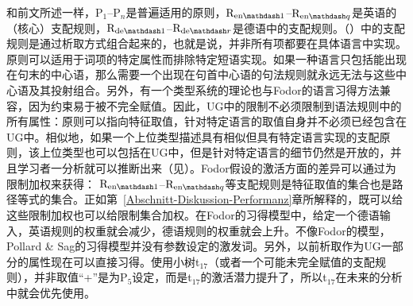 和前文所述一样，P$_1$--P$_n$是普遍适用的原则，$\mathrm{R}_{\mathrm{en}\mathdash1}$--$\mathrm{R}_{\mathrm{en}\mathdash q}$是英语的（核心）支配规则，$\mathrm{R}_{\mathrm{de}\mathdash1}$--$\mathrm{R}_{\mathrm{de}\mathdash r}$是德语中的支配规则。（）中的支配规则是通过析取方式组合起来的，也就是说，并非所有项都要在具体语言中实现。原则可以适用于词项的特定属性而排除特定短语实现。如果一种语言只包括能出现在句末的中心语，那么需要一个出现在句首中心语的句法规则就永远无法与这些中心语及其投射组合。另外，有一个类型系统的理论也与Fodor的语言习得方法兼容，因为约束易于被不完全赋值。因此，UG中的限制不必须限制到语法规则中的所有属性：原则可以指向特征取值，针对特定语言的取值自身并不必须已经包含在UG中。相似地，如果一个上位类型描述具有相似但具有特定语言实现的支配原则，该上位类型也可以包括在UG中，但是针对特定语言的细节仍然是开放的，并且学习者一分析就可以推断出来（见\citealp[\S~9.2]{AW98a}）。Fodor假设的激活方面的差异可以通过为限制加权来获得： $\mathrm{R}_{\mathrm{en}\mathdash1}$--$\mathrm{R}_{\mathrm{en}\mathdash q}$等支配规则是特征取值的集合也是路径等式的集合。正如第~\ref{Abschnitt-Diskussion-Performanz}章所解释的，既可以给这些限制加权也可以给限制集合加权。在Fodor的习得模型中，给定一个德语输入，英语规则的权重就会减少，德语规则的权重就会上升。不像Fodor的模型，Pollard \& Sag的习得模型并没有参数设定的激发词。另外，以前析取作为UG一部分的属性现在可以直接习得。使用小树t$_{17}$（或者一个可能未完全赋值的支配规则），并非取值“+”是为P$_5$设定，而是t$_{17}$的激活潜力提升了，所以t$_{17}$在未来的分析中就会优先使用。
